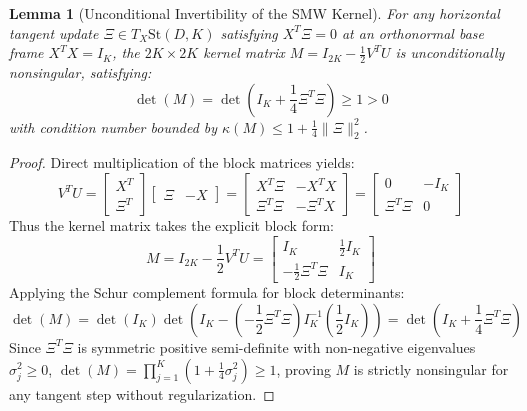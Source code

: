 \documentclass[journal,10pt,compsoc]{IEEEtran}
\theoremstyle{plain}
\newtheorem{lemma}{Lemma}
\theoremstyle{definition}
\begin{document}
\begin{lemma}[Unconditional Invertibility of the SMW Kernel]
\label{lem:smw_invertibility}
For any horizontal tangent update $\Xi \in T_X \mathrm{St}(D, K)$ satisfying $X^T \Xi = 0$ at an orthonormal base frame $X^T X = I_K$, the $2K \times 2K$ kernel matrix $M = I_{2K} - \frac{1}{2} V^T U$ is unconditionally nonsingular, satisfying:
\begin{equation}
\label{eq:smw_det}
\det(M) = \det\left( I_K + \frac{1}{4} \Xi^T \Xi \right) \ge 1 > 0
\end{equation}
with condition number bounded by $\kappa(M) \le 1 + \frac{1}{4} \|\Xi\|_2^2$.
\end{lemma}
\begin{proof}
Direct multiplication of the block matrices yields:
\begin{equation}
V^T U = \begin{bmatrix} X^T \\ \Xi^T \end{bmatrix} \begin{bmatrix} \Xi & -X \end{bmatrix} = \begin{bmatrix} X^T \Xi & -X^T X \\ \Xi^T \Xi & -\Xi^T X \end{bmatrix} = \begin{bmatrix} 0 & -I_K \\ \Xi^T \Xi & 0 \end{bmatrix}
\end{equation}
Thus the kernel matrix takes the explicit block form:
\begin{equation}
M = I_{2K} - \frac{1}{2} V^T U = \begin{bmatrix} I_K & \frac{1}{2} I_K \\ -\frac{1}{2} \Xi^T \Xi & I_K \end{bmatrix}
\end{equation}
Applying the Schur complement formula for block determinants:
\begin{equation}
\det(M) = \det(I_K) \det\left( I_K - \left(-\frac{1}{2} \Xi^T \Xi\right) I_K^{-1} \left(\frac{1}{2} I_K\right) \right) = \det\left( I_K + \frac{1}{4} \Xi^T \Xi \right)
\end{equation}
Since $\Xi^T \Xi$ is symmetric positive semi-definite with non-negative eigenvalues $\sigma_j^2 \ge 0$, $\det(M) = \prod_{j=1}^K (1 + \frac{1}{4} \sigma_j^2) \ge 1$, proving $M$ is strictly nonsingular for any tangent step without regularization.
\end{proof}
\end{document}
